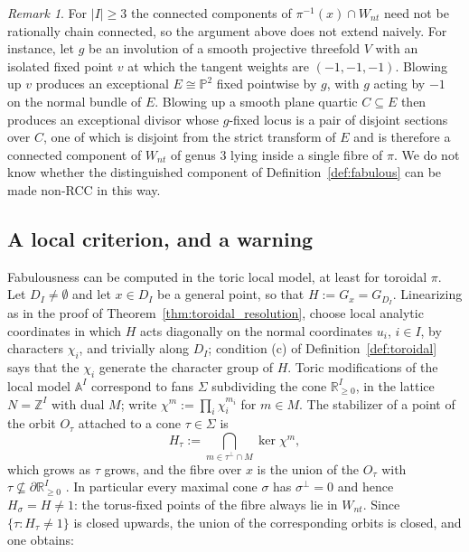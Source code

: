 \documentclass[11pt]{amsart}
\theoremstyle{plain}
\theoremstyle{definition}
\theoremstyle{remark}
\newtheorem{remark}[theorem]{Remark}
\numberwithin{equation}{section}
\begin{document}
\begin{remark}
For $|I| \geq 3$ the connected components of $\pi^{-1}(x) \cap W_{nt}$ need
not be rationally chain connected, so the argument above does not extend
naively.  For instance, let $g$ be an involution of a smooth projective
threefold $V$ with an isolated fixed point $v$ at which the tangent weights
are $(-1,-1,-1)$.  Blowing up $v$ produces an exceptional
$E \cong \mathbb{P}^2$ fixed pointwise by $g$, with $g$ acting by $-1$ on
the normal bundle of $E$.  Blowing up a smooth plane quartic $C \subseteq E$
then produces an exceptional divisor whose $g$-fixed locus is a pair of
disjoint sections over $C$, one of which is disjoint from the strict
transform of $E$ and is therefore a connected component of $W_{nt}$ of
genus $3$ lying inside a single fibre of $\pi$.  We do not know whether the
distinguished component of Definition~\ref{def:fabulous} can be made
non-RCC in this way.
\end{remark}

\subsection*{A local criterion, and a warning}

Fabulousness can be computed in the toric local model, at least for
toroidal $\pi$.  Let $D_I \neq \emptyset$ and let $x \in D_I$ be a general
point, so that $H := G_x = G_{D_I}$.  Linearizing as in the proof of
Theorem~\ref{thm:toroidal_resolution}, choose local analytic coordinates in
which $H$ acts diagonally on the normal coordinates $u_i$, $i \in I$, by
characters $\chi_i$, and trivially along $D_I$; condition (c) of
Definition~\ref{def:toroidal} says that the $\chi_i$ generate the character
group of $H$.  Toric modifications of the local model $\mathbb{A}^I$
correspond to fans $\Sigma$ subdividing the cone $\mathbb{R}^I_{\geq 0}$, in
the lattice $N = \mathbb{Z}^I$ with dual $M$; write
$\chi^m := \prod_i \chi_i^{m_i}$ for $m \in M$.  The stabilizer of a point
of the orbit $O_\tau$ attached to a cone $\tau \in \Sigma$ is
\[
H_\tau := \bigcap_{m \in \tau^\perp \cap M} \ker \chi^m ,
\]
which grows as $\tau$ grows, and the fibre over $x$ is the union of the
$O_\tau$ with $\tau \not\subseteq \partial \mathbb{R}^I_{\geq 0}$
\cite{Fulton}.  In particular every maximal cone $\sigma$ has
$\sigma^\perp = 0$ and hence $H_\sigma = H \neq 1$: the torus-fixed points
of the fibre always lie in $W_{nt}$.  Since $\{\tau : H_\tau \neq 1\}$ is
closed upwards, the union of the corresponding orbits is closed, and one
obtains:
\end{document}
